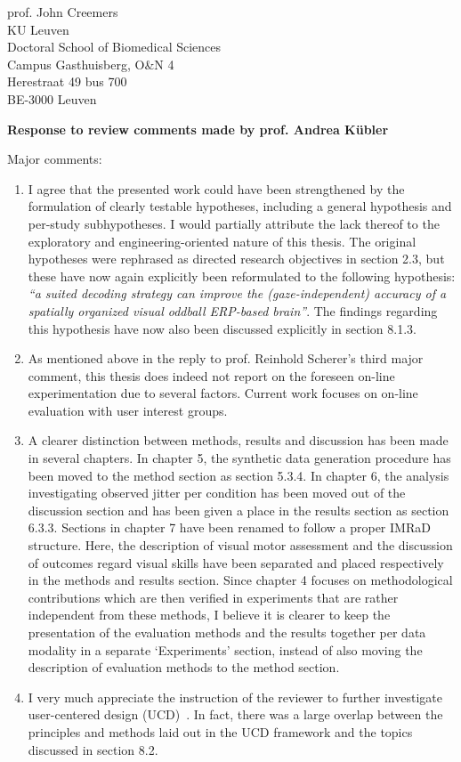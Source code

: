 \documentclass{letter}
\newcommand{\reply}[1]{%
	\textbf{Response to review comments made by prof. #1}

}
\begin{document}
\begin{letter}{%
	prof. John Creemers \\
	KU Leuven \\
	Doctoral School of Biomedical Sciences \\
	Campus Gasthuisberg, O\&N 4 \\
	Herestraat 49 bus 700 \\
	BE-3000 Leuven

}
\reply{Andrea K\"ubler}
Major comments:
\begin{enumerate}
  \item  I agree that the presented work could have been strengthened by the
  formulation of clearly testable hypotheses, including a general hypothesis
  and per-study subhypotheses.
  I would partially attribute the lack thereof to the exploratory and
  engineering-oriented nature of this thesis.
  The original hypotheses were rephrased as directed research objectives in
  section 2.3, but these have now again explicitly been reformulated to the
  following hypothesis: \emph{``a suited decoding strategy can improve the
    (gaze-independent) accuracy of a spatially organized visual oddball
    ERP-based brain''}.
  The findings regarding this hypothesis have now also been discussed
    explicitly in section 8.1.3.
  \item As mentioned above in the reply to prof. Reinhold Scherer's third major
    comment, this thesis does indeed not report on the foreseen on-line
    experimentation due to several factors.
    Current work focuses on on-line evaluation with user interest groups.
  \item
    A clearer distinction between methods, results and discussion has been made
    in several chapters.
    In chapter 5, the synthetic data generation procedure has been
    moved to the method section as section 5.3.4.
    In chapter 6, the analysis investigating observed jitter per condition has
    been moved out of the discussion section and has been given a place in the
    results section as section 6.3.3.
    Sections in chapter 7 have been renamed to follow a proper IMRaD structure.
    Here, the description of visual motor assessment and the
    discussion of outcomes regard visual skills have been separated and placed
    respectively in the methods and results section.
    Since chapter 4 focuses on methodological contributions which are then
    verified in experiments that are rather independent from these methods, I
    believe it is clearer to keep the presentation of the evaluation methods
    and the results together per data modality in a separate `Experiments'
    section, instead of also moving the description of evaluation methods to
    the method section.
  \item I very much appreciate the instruction of the reviewer to further
    investigate user-centered design (UCD)~\cite{Standardization2009,Kuebler2014}.
    In fact, there was a large overlap between the principles and methods laid
    out in the UCD framework and the topics discussed in section 8.2.

\end{enumerate}
\end{letter}
\end{document}
